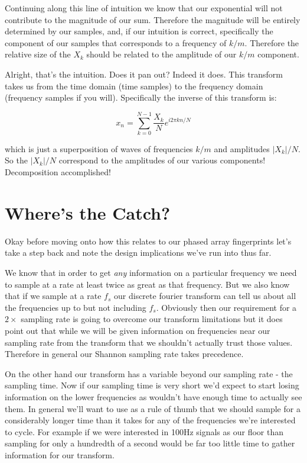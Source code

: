 \documentclass[12pt,a6paper]{book}
\begin{document}
Continuing along this line of intuition we know that our exponential will not contribute to the magnitude of our sum. Therefore the magnitude will be entirely determined by our samples, and, if our intuition is correct, specifically the component of our samples that corresponds to a frequency of $k/m$. Therefore the relative size of the $X_k$ should be related to the amplitude of our $k/m$ component. 

Alright, that's the intuition. Does it pan out? Indeed it does. This transform takes us from the time domain (time samples) to the frequency domain (frequency samples if you will). Specifically the inverse of this transform is:

\begin{equation}
x_n = \sum_{k=0}^{N-1}\frac{X_k}{N} e^{i2\pi kn/N}
\end{equation}

which is just a superposition of waves of frequencies $k/m$ and amplitudes $|X_k|/N$. So the $|X_k|/N$ correspond to the amplitudes of our various components! Decomposition accomplished!

\section{Where's the Catch?}
Okay before moving onto how this relates to our phased array fingerprints let's take a step back and note the design implications we've run into thus far. 

We know that in order to get \textit{any} information on a particular frequency we need to sample at a rate at least twice as great as that frequency. But we also know that if we sample at a rate $f_s$ our discrete fourier transform can tell us about all the frequencies up to but not including $f_s$. Obviously then our requirement for a $2\times$ sampling rate is going to overcome our transform limitations but it does point out that while we will be given information on frequencies near our sampling rate from the transform that we shouldn't actually trust those values. Therefore in general our Shannon sampling rate takes precedence.

On the other hand our transform has a variable beyond our sampling rate - the sampling time. Now if our sampling time is very short we'd expect to start losing information on the lower frequencies as wouldn't have enough time to actually see them. In general we'll want to use as a rule of thumb that we should sample for a considerably longer time than it takes for any of the frequencies we're interested to cycle. For example if we were interested in 100Hz signals as our floor than sampling for only a hundredth of a second would be far too little time to gather information for our transform. 
\end{document}
